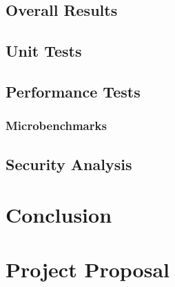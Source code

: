 \documentclass[12pt,a4paper,twoside,openright]{report}
\begin{document}








\section{Overall Results}

\section{Unit Tests}

\section{Performance Tests}

\subsection{Microbenchmarks}

\section{Security Analysis}

\chapter{Conclusion}




\appendix

\chapter{Project Proposal}


\end{document}
